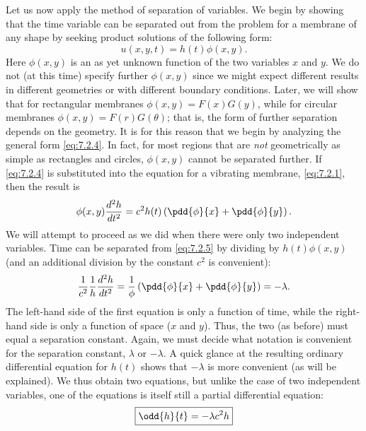 Let us now apply the method of separation of variables.  We begin by showing that the time variable can be separated out from the problem for a membrane of any shape by seeking product solutions of the following form:
\begin{equation}
\boxed{u(x,y,t) = h(t)\phi(x,y).}
\label{eq:7.2.4}
\end{equation}
Here $\phi(x,y)$ is an as yet unknown function of the two variables $x$ and $y$.  We do not (at this time) specify further $\phi(x,y)$ since we might expect different results in different geometries or with different boundary conditions.  Later, we will show that for rectangular membranes $\phi(x,y) = F(x)G(y)$, while for circular membranes $\phi(x,y) = F(r)G(\theta)$; that is, the form of further separation depends on the geometry.  It is for this reason that we begin by analyzing the general form \eqref{eq:7.2.4}.  In fact, for most regions that are \emph{not} geometrically as simple as rectangles and circles, $\phi(x,y)$ cannot be separated further.  If \eqref{eq:7.2.4} is substituted into the equation for a vibrating membrane, \eqref{eq:7.2.1}, then the result is
\begin{equation}
\phi(x,y)\frac{d^2 h}{dt^2} = c^2 h(t)\left(\pdd{\phi}{x} + \pdd{\phi}{y}\right).
\label{eq:7.2.5}
\end{equation}
We will attempt to proceed as we did when there were only two independent variables.  Time can be separated from \eqref{eq:7.2.5} by dividing by $h(t)\phi(x,y)$ (and an additional division by the constant $c^2$ is convenient):
\begin{equation}
\frac{1}{c^2}\frac{1}{h}\frac{d^2 h}{dt^2} = \frac{1}{\phi}\left(\pdd{\phi}{x} + \pdd{\phi}{y}\right) = -\lambda.
\label{eq:7.2.6}
\end{equation}
The left-hand side of the first equation is only a function of time, while the right-hand side is only a function of space ($x$ and $y$).  Thus, the two (as before) must equal a separation constant.  Again, we must decide what notation is convenient for the separation constant, $\lambda$ or $-\lambda$.  A quick glance at the resulting ordinary differential equation for $h(t)$ shows that $-\lambda$ is more convenient (as will be explained).  We thus obtain two equations, but unlike the case of two independent variables, one of the equations is itself still a partial differential equation:
\begin{equation}
\boxed{\odd{h}{t} = -\lambda c^2 h}
\label{eq:7.2.7}
\end{equation}
